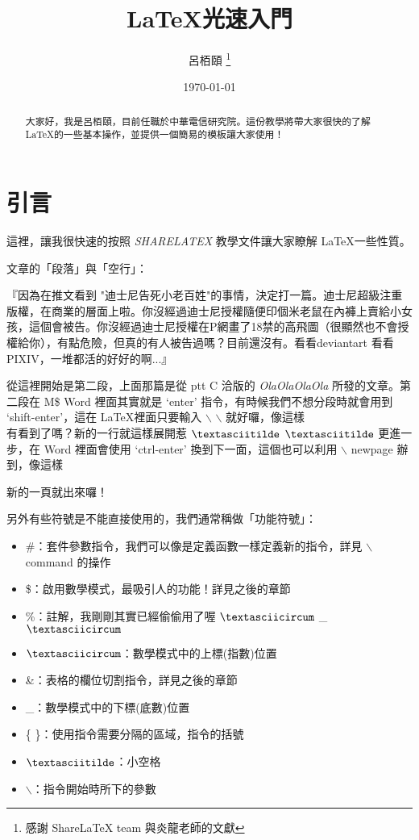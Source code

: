 \documentclass[12pt, letterpaper]{article}
\title{\LaTeX 光速入門}
\author{呂栢頤 \thanks{感謝 ShareLaTeX team 與炎龍老師的文獻}}
\date{\today}
\begin{document}
\begin{titlepage}
\maketitle
\end{titlepage}

\begin{abstract}
大家好，我是呂栢頤，目前任職於中華電信研究院。這份教學將帶大家很快的了解 \LaTeX 的一些基本操作，並提供一個簡易的模板讓大家使用！
\end{abstract}

\begin{comment}
這裡的文字不會顯示在文章中， \LaTeX 裡註解的方法除了 \% 外，這也是一個常用的多行註解方式，需要搭配 \textit{comment} 套件。
\end{comment}

\section{引言}
這裡，讓我很快速的按照 \textit{SHARELATEX} 教學文件讓大家瞭解 \LaTeX 一些性質。

文章的「段落」與「空行」：

『因為在推文看到 "迪士尼告死小老百姓"的事情，決定打一篇。迪士尼超級注重版權，在商業的層面上啦。你沒經過迪士尼授權隨便印個米老鼠在內褲上賣給小女孩，這個會被告。你沒經過迪士尼授權在P網畫了18禁的高飛圖（很顯然也不會授權給你），有點危險，但真的有人被告過嗎？目前還沒有。看看deviantart 看看 PIXIV，一堆都活的好好的啊...』

從這裡開始是第二段，上面那篇是從 ptt C 洽版的 \textit{OlaOlaOlaOla} 所發的文章。第二段在 M\$ Word 裡面其實就是 `enter' 指令，有時候我們不想分段時就會用到 `shift-enter'，這在 \LaTeX 裡面只要輸入 $\backslash$ $\backslash$ 就好囉，像這樣 \\
有看到了嗎？新的一行就這樣展開惹 $\textasciitilde$ $\textasciitilde$ 更進一步，在 Word 裡面會使用 `ctrl-enter' 換到下一面，這個也可以利用 $\backslash$ newpage 辦到，像這樣 \newpage

新的一頁就出來囉！

另外有些符號是不能直接使用的，我們通常稱做「功能符號」：

\begin{itemize}
\item \#：套件參數指令，我們可以像是定義函數一樣定義新的指令，詳見 $\backslash$command 的操作
\item \$：啟用數學模式，最吸引人的功能！詳見之後的章節
\item \%：註解，我剛剛其實已經偷偷用了喔 $\textasciicircum$ \_ $\textasciicircum$
\item $\textasciicircum$：數學模式中的上標(指數)位置
\item \&：表格的欄位切割指令，詳見之後的章節
\item \_：數學模式中的下標(底數)位置
\item \{ \}：使用指令需要分隔的區域，指令的括號
\item $\textasciitilde$：小空格
\item $\backslash$：指令開始時所下的參數
\end{itemize}
\end{document}
